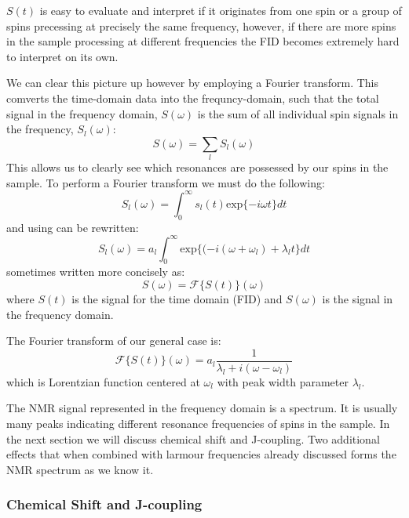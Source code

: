 $S(t)$ is easy to evaluate and interpret if it originates from one spin or a group of spins precessing
at precisely the same frequency, however, if there are more spins in the sample processing at different frequencies
the FID becomes extremely hard to interpret on its own.

We can clear this picture up however by employing a Fourier transform. This comverts the time-domain data
into the frequncy-domain, such that the total signal in the frequency domain, $S(\omega)$ is the sum of all individual spin signals in the frequency, $S_l(\omega)$:
\begin{equation}
  S(\omega) = \sum_l S_l(\omega)
\end{equation}
This allows us to clearly see which resonances are possessed by our spins in the sample. To
perform a Fourier transform we must do the following:
\begin{equation}
  S_l(\omega) = \int_{0}^{\infty}s_l(t)\text{exp}\{-i\omega t\}dt
\end{equation}
and using  can be rewritten:
\begin{equation}
  S_l(\omega) = a_l\int_{0}^{\infty}\text{exp}\{(-i(\omega+\omega_l)+\lambda_l t\}dt
\end{equation}
sometimes written more concisely as:
\begin{equation}
  S(\omega) = \mathcal{F}\{S(t)\}(\omega)
\end{equation}
where $S(t)$ is the signal for the time domain (FID) and $S(\omega)$ is the signal in the frequency domain.

The Fourier transform of our general case is:
\begin{equation}
  \mathcal{F}\{S(t)\}(\omega) = a_l\frac{1}{\lambda_l + i(\omega - \omega_l)}
\end{equation}
which is Lorentzian function centered at $\omega_l$ with peak width parameter $\lambda_l$.

The NMR signal represented in the frequency domain is a spectrum. It is usually many peaks
indicating different resonance frequencies of spins in the sample. In the next
section we will discuss chemical shift and J-coupling. Two additional effects that when combined
with larmour frequencies already discussed forms the NMR spectrum as we know it.

\subsubsection{Chemical Shift and J-coupling}

